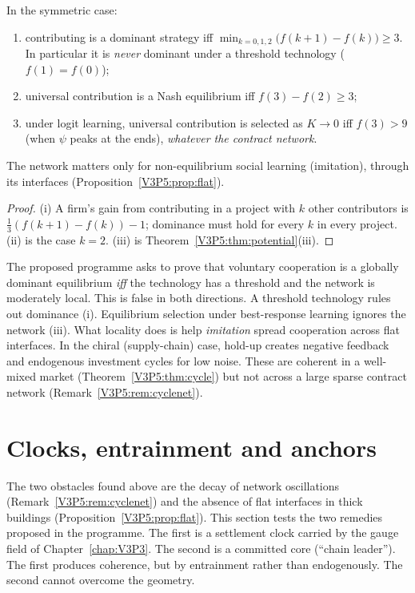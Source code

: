 \begin{proposition}\label{V3P5:prop:econ}
In the symmetric case:
\begin{enumerate}
\item[(i)] contributing is a dominant strategy iff $\min_{k=0,1,2}\bigl(f(k+1)-f(k)\bigr)\ge3$. In
particular it is \emph{never} dominant under a threshold technology ($f(1)=f(0)$);
\item[(ii)] universal contribution is a Nash equilibrium iff $f(3)-f(2)\ge3$;
\item[(iii)] under logit learning, universal contribution is selected as $K\to0$ iff $f(3)>9$
(when $\psi$ peaks at the ends), \emph{whatever the contract network}.
\end{enumerate}
The network matters only for non-equilibrium social learning (imitation), through its
interfaces (Proposition~\ref{V3P5:prop:flat}).
\end{proposition}

\begin{proof}
(i) A firm's gain from contributing in a project with $k$ other contributors is
$\frac13(f(k+1)-f(k))-1$; dominance must hold for every $k$ in every project. (ii) is the case
$k=2$. (iii) is Theorem~\ref{V3P5:thm:potential}(iii).
\end{proof}

The proposed programme asks to prove that voluntary cooperation is a globally dominant equilibrium
\emph{iff} the technology has a threshold and the network is moderately local. This is false in
both directions. A threshold technology rules out dominance (i). Equilibrium selection
under best-response learning ignores the network (iii). What locality does is help
\emph{imitation} spread cooperation across flat interfaces. In the chiral (supply-chain) case,
hold-up creates negative feedback and endogenous investment cycles for low noise. These are
coherent in a well-mixed market (Theorem~\ref{V3P5:thm:cycle}) but not across a large sparse
contract network (Remark~\ref{V3P5:rem:cyclenet}).

\section{Clocks, entrainment and anchors}\label{V3P5:sec:clocks}

The two obstacles found above are the decay of network oscillations
(Remark~\ref{V3P5:rem:cyclenet}) and the absence of flat interfaces in thick buildings
(Proposition~\ref{V3P5:prop:flat}). This section tests the two remedies proposed in the
programme. The first is a settlement clock carried by the gauge field of Chapter~\ref{chap:V3P3}. The second is
a committed core (``chain leader''). The first produces coherence, but by entrainment rather than
endogenously. The second cannot overcome the geometry.

